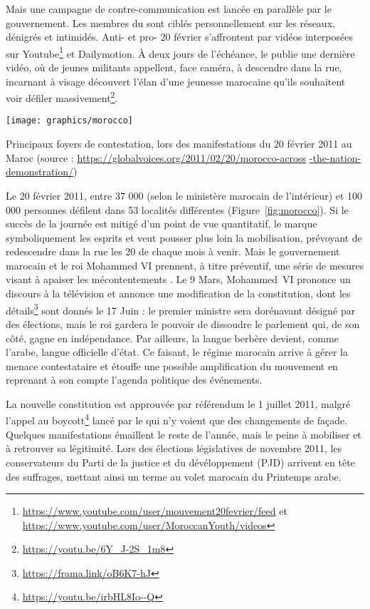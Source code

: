 \documentclass[symmetric,justified,marginals=raggedouter]{tufte-book}
\begin{document}
Mais une campagne de contre-communication est lancée en parallèle par le gouvernement. Les membres du  sont ciblés personnellement sur les réseaux, dénigrés et intimidés. Anti- et pro- 20 février s'affrontent par vidéos interposées sur Youtube\footnote{\RaggedOuter \url{https://www.youtube.com/user/mouvement20fevrier/feed} et \url{https://www.youtube.com/user/MoroccanYouth/videos}} et Dailymotion. À deux jours de l'échéance, le  publie une dernière vidéo, où de jeunes militants appellent, face caméra, à descendre dans la rue, incarnant à visage découvert l'élan d'une jeunesse marocaine qu'ils souhaitent voir défiler massivement\footnote{\RaggedOuter \url{https://youtu.be/6Y_J-2S_1m8}}.

\begin{marginfigure}%
  \texttt{[image: graphics/morocco]}
  \vspace*{0.2cm}  
  \caption{Principaux foyers de contestation, lors des manifestations du 20 février 2011 au Maroc (source : \url{ https://globalvoices.org/2011/02/20/morocco-across} \url{-the-nation-demonstration/}) }
  \label{fig:morocco}
\end{marginfigure} 

Le 20 février 2011, entre 37 000 (selon le ministère marocain de l'intérieur) et 100 000 personnes défilent dans 53 localités différentes (Figure~\ref{fig:morocco}). Si le succès de la journée est mitigé d'un point de vue quantitatif, le  marque symboliquement les esprits et veut pousser plus loin la mobilisation, prévoyant de redescendre dans la rue les 20 de chaque mois à venir. Mais le gouvernement marocain et le roi Mohammed VI prennent, à titre préventif, une série de mesures visant à apaiser les mécontentements \citep{desrues_mouvement_2012}. Le 9 Mars, Mohammed~VI prononce un discours à la télévision et annonce une modification de la constitution, dont les détails\footnote{\RaggedOuter \url{https://frama.link/oB6K7-hJ}} sont donnés le 17 Juin : le premier ministre sera dorénavant désigné par des élections, mais le roi gardera le pouvoir de dissoudre le parlement qui, de son côté, gagne en indépendance. Par ailleurs, la langue berbère devient, comme l'arabe, langue officielle d'état. Ce faisant, le régime marocain arrive à gérer la menace contestataire et étouffe une possible amplification du mouvement en reprenant à son compte l'agenda politique des événements. 

La nouvelle constitution est approuvée par référendum le 1\ier{} juillet 2011, malgré l'appel au boycott\footnote{\RaggedOuter \url{https://youtu.be/irbHL8Io--Q}} lancé par le  qui n'y voient que des changements de façade. Quelques manifestations émaillent le reste de l'année, mais le  peine à mobiliser et à retrouver sa légitimité. Lors des élections législatives de novembre 2011, les conservateurs du Parti de la justice et du dévéloppement (PJD) arrivent en tête des suffrages, mettant ainsi un terme au volet marocain du Printemps arabe.
\end{document}
